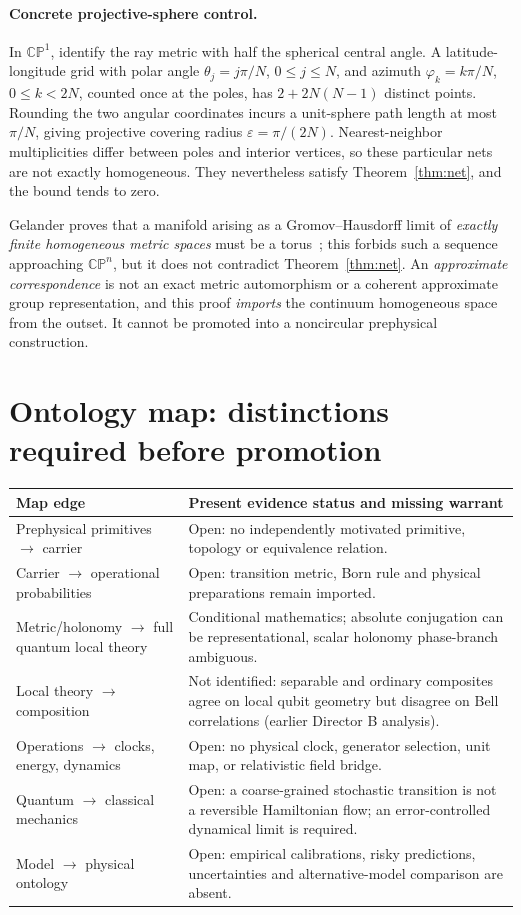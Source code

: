 \documentclass[11pt,a4paper]{article}
\newcommand{\CP}{\mathbb{CP}}
\begin{document}
\paragraph{Concrete projective-sphere control.} In $\CP^1$, identify the ray metric with half the spherical central angle. A latitude-longitude grid with polar angle $\theta_j=j\pi/N$, $0\le j\le N$, and azimuth $\varphi_k=k\pi/N$, $0\le k<2N$, counted once at the poles, has $2+2N(N-1)$ distinct points. Rounding the two angular coordinates incurs a unit-sphere path length at most $\pi/N$, giving projective covering radius $\varepsilon=\pi/(2N)$. Nearest-neighbor multiplicities differ between poles and interior vertices, so these particular nets are not exactly homogeneous. They nevertheless satisfy Theorem~\ref{thm:net}, and the bound tends to zero.

Gelander proves that a manifold arising as a Gromov--Hausdorff limit of \emph{exactly finite homogeneous metric spaces} must be a torus~\cite{gelander}; this forbids such a sequence approaching $\CP^n$, but it does not contradict Theorem~\ref{thm:net}. An \emph{approximate correspondence} is not an exact metric automorphism or a coherent approximate group representation, and this proof \emph{imports} the continuum homogeneous space from the outset. It cannot be promoted into a noncircular prephysical construction.

\section{Ontology map: distinctions required before promotion}
\begin{center}
\small
\begin{tabular}{@{}p{}p{}@{}}
\toprule
Map edge & Present evidence status and missing warrant \\
\midrule
Prephysical primitives $\to$ carrier & Open: no independently motivated primitive, topology or equivalence relation. \\
Carrier $\to$ operational probabilities & Open: transition metric, Born rule and physical preparations remain imported. \\
Metric/holonomy $\to$ full quantum local theory & Conditional mathematics; absolute conjugation can be representational, scalar holonomy phase-branch ambiguous. \\
Local theory $\to$ composition & Not identified: separable and ordinary composites agree on local qubit geometry but disagree on Bell correlations (earlier Director B analysis). \\
Operations $\to$ clocks, energy, dynamics & Open: no physical clock, generator selection, unit map, or relativistic field bridge. \\
Quantum $\to$ classical mechanics & Open: a coarse-grained stochastic transition is not a reversible Hamiltonian flow; an error-controlled dynamical limit is required. \\
Model $\to$ physical ontology & Open: empirical calibrations, risky predictions, uncertainties and alternative-model comparison are absent. \\
\bottomrule
\end{tabular}
\end{center}
\end{document}
